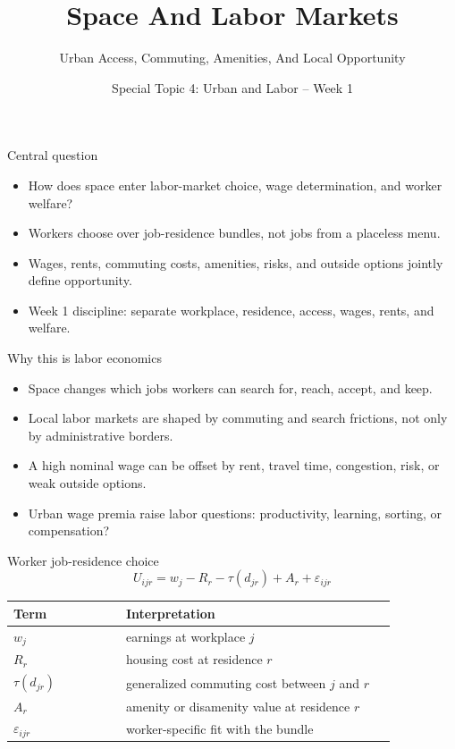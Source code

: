 \documentclass[aspectratio=169,11pt]{beamer}
\title{Space And Labor Markets}
\subtitle{Urban Access, Commuting, Amenities, And Local Opportunity}
\author{Special Topic 4: Urban and Labor -- Week 1}
\date{}
\begin{document}
\begin{frame}
  \titlepage
\end{frame}

\begin{frame}{Central question}
\begin{itemize}
    \item How does space enter labor-market choice, wage determination, and worker welfare?
    \item Workers choose over job-residence bundles, not jobs from a placeless menu.
    \item Wages, rents, commuting costs, amenities, risks, and outside options jointly define opportunity.
    \item Week 1 discipline: separate workplace, residence, access, wages, rents, and welfare.
\end{itemize}
\end{frame}

\begin{frame}{Why this is labor economics}
\begin{itemize}
    \item Space changes which jobs workers can search for, reach, accept, and keep.
    \item Local labor markets are shaped by commuting and search frictions, not only by administrative borders.
    \item A high nominal wage can be offset by rent, travel time, congestion, risk, or weak outside options.
    \item Urban wage premia raise labor questions: productivity, learning, sorting, or compensation?
\end{itemize}
\end{frame}

\begin{frame}{Worker job-residence choice}
\[
U_{ijr} = w_j - R_r - \tau(d_{jr}) + A_r + \varepsilon_{ijr}
\]
\small
\begin{tabular}{p{0.25\linewidth} p{0.60\linewidth}}
\toprule
Term & Interpretation \\
\midrule
$w_j$ & earnings at workplace $j$ \\
$R_r$ & housing cost at residence $r$ \\
$\tau(d_{jr})$ & generalized commuting cost between $j$ and $r$ \\
$A_r$ & amenity or disamenity value at residence $r$ \\
$\varepsilon_{ijr}$ & worker-specific fit with the bundle \\
\bottomrule
\end{tabular}
\end{frame}
\end{document}
